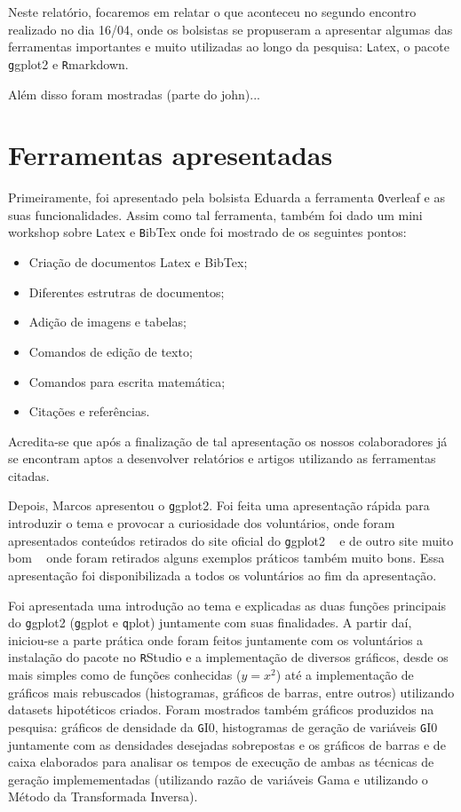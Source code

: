 \documentclass[12pt,letterpaper]{article}
\begin{document}
Neste relatório, focaremos em relatar o que aconteceu no segundo encontro realizado no dia 16/04, onde os bolsistas se propuseram a apresentar algumas das ferramentas importantes e muito utilizadas ao longo da pesquisa: \texttt Latex, o pacote \texttt ggplot2 e \texttt Rmarkdown. 

Além disso foram mostradas (parte do john)...


\section{Ferramentas apresentadas}
 
Primeiramente, foi apresentado pela bolsista Eduarda a ferramenta \texttt Overleaf e as suas funcionalidades. Assim como tal ferramenta, também foi dado um mini workshop sobre \texttt Latex e \texttt BibTex onde foi mostrado de os seguintes pontos:

\begin{itemize}
\item Criação de documentos Latex e BibTex;
\item Diferentes estrutras de documentos;
\item Adição de imagens e tabelas;
\item Comandos de edição de texto;
\item Comandos para escrita matemática;
\item Citações e referências.
\end{itemize}

Acredita-se que após a finalização de tal apresentação os nossos colaboradores já se encontram aptos a desenvolver relatórios e artigos utilizando as ferramentas citadas.

Depois, Marcos apresentou o \texttt ggplot2. Foi feita uma apresentação rápida para introduzir o tema e provocar a curiosidade dos voluntários, onde foram apresentados conteúdos retirados do site oficial do \texttt ggplot2 ~\cite{ggplot}
e de outro site muito bom  ~\cite{ggplot2} onde foram retirados alguns exemplos práticos também muito bons. Essa apresentação foi disponibilizada a todos os voluntários ao fim da apresentação.

Foi apresentada uma introdução ao tema e explicadas as duas funções principais do \texttt ggplot2 (\texttt ggplot e \texttt qplot) juntamente com suas finalidades. A partir daí, iniciou-se a parte prática onde foram feitos juntamente com os voluntários a instalação do pacote no \texttt RStudio e a implementação de diversos gráficos, desde os mais simples como de funções conhecidas ($y = x^{2}$) até a implementação de gráficos mais rebuscados (histogramas, gráficos de barras, entre outros) utilizando datasets hipotéticos criados. Foram mostrados também gráficos produzidos na pesquisa: gráficos de densidade da \texttt GI0, histogramas de geração de variáveis \texttt GI0 juntamente com as densidades desejadas sobrepostas e os gráficos de barras e de caixa elaborados para analisar os tempos de execução de ambas as técnicas de geração implemementadas (utilizando razão de variáveis Gama e utilizando o Método da Transformada Inversa).
\end{document}
